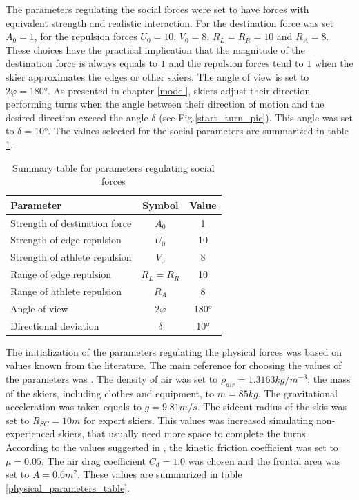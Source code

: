 \documentclass[12pt,a4paper,twoside]{book}
\begin{document}
The parameters regulating the social forces were set to have forces with equivalent strength and realistic interaction. For the destination force was set $A_0=1$, for the repulsion forces $U_0=10$, $V_0=8$, $R_L=R_R=10$ and $R_A=8$. These choices have the practical implication that the magnitude of the destination force is always equals to $1$ and the repulsion forces tend to $1$ when the skier approximates the edges or other skiers. The angle of view is set to $2\varphi=180°$. As presented in chapter \ref{model}, skiers adjust their direction performing turns when the angle between their direction of motion and the desired direction exceed the angle $\delta$ (see Fig.\ref{start_turn_pic}). This angle was set to $\delta=10°$. The values selected for the social parameters are summarized in table \ref{social_parameters_table}.

\begin{table}
  \centering
  \begin{tabular}{ l | c | c }
    \hline
    Parameter & Symbol & Value \\
    \hline
    Strength of destination force & $A_0$ & 1 \\
    Strength of edge repulsion & $U_0$ & 10 \\
    Strength of athlete repulsion & $V_0$ & 8 \\
    Range of edge repulsion & $R_L=R_R$ & 10 \\
    Range of athlete repulsion & $R_A$ & 8 \\
    Angle of view & $2\varphi$ & 180° \\
    Directional deviation & $\delta$ & 10° \\
    \hline
  \end{tabular}
  \caption{Summary table for parameters regulating social forces}
  \label{social_parameters_table}
\end{table}

The initialization of the parameters regulating the physical forces was based on values known from the literature. The main reference for choosing the values of the parameters was \cite{hol2012}. The density of air was set to $\rho_{air}=1.3163 kg/m^{-3}$, the mass of the skiers, including clothes and equipment, to $m=85 kg$. The gravitational acceleration was taken equals to $g=9.81 m/s$. The sidecut radius of the skis was set to $R_{SC}=10 m$ for expert skiers. This values was increased simulating non-experienced skiers, that usually need more space to complete the turns. According to the values suggested in \cite{bu2004}, the kinetic friction coefficient was set to $\mu = 0.05$. The air drag coefficient $C_d = 1.0$ was chosen and the frontal area was set to $A=0.6 m^2$. These values are summarized in table \ref{physical_parameters_table}.
\end{document}
